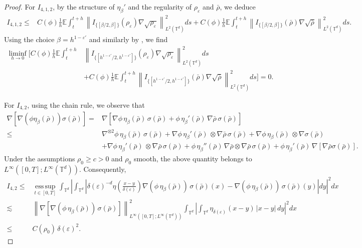 \documentclass[UTF-8,reqno]{amsart}
\numberwithin{equation}{section}
\def\geq{\geqslant}
\def\leq{\leqslant}
\def\geq{\geqslant}
\def\leq{\leqslant}
\begin{document}
\begin{proof}
For $I_{4,1,2}$, by the structure of $\eta_{\beta}'$ and the regularity of $\rho_{\varepsilon}$ and $\bar{\rho}$, we deduce
\begin{align*}
I_{4,1,2} \leq& C(\phi) \frac{1}{h} \mathbb{E} \int_t^{t+h} \left\| I_{\{[\beta/2,\beta]\}}(\rho_{\varepsilon}) \nabla\sqrt{\rho_{\varepsilon}} \right\|_{L^2(\mathbb{T}^d)}^2 ds + C(\phi) \frac{1}{h} \mathbb{E} \int_t^{t+h} \left\| I_{\{[\beta/2,\beta]\}}(\bar{\rho}) \nabla\sqrt{\bar{\rho}} \right\|_{L^2(\mathbb{T}^d)}^2 ds.
\end{align*}
Using the choice $\beta = h^{1-\varepsilon'}$ and similarly by \cite[Lemma 7]{FG23}, we find
\begin{align*}
\liminf_{h \to 0} \Big[ C(\phi) \frac{1}{h} \mathbb{E} \int_t^{t+h} &\left\| I_{\{[h^{1-\varepsilon'}/2, h^{1-\varepsilon'}]\}}(\rho_{\varepsilon}) \nabla\sqrt{\rho_{\varepsilon}} \right\|_{L^2(\mathbb{T}^d)}^2 ds\\
 &+ C(\phi) \frac{1}{h} \mathbb{E} \int_t^{t+h} \left\| I_{\{[h^{1-\varepsilon'}/2, h^{1-\varepsilon'}]\}}(\bar{\rho}) \nabla\sqrt{\bar{\rho}} \right\|_{L^2(\mathbb{T}^d)}^2 ds \Big] = 0.
\end{align*}



For $I_{4,2}$, using the chain rule, we observe that
\begin{align*}
\nabla[\nabla(\phi\eta_{\beta}(\bar{\rho}))\sigma(\bar{\rho})]
=& \nabla[\nabla\phi\,\eta_{\beta}(\bar{\rho})\,\sigma(\bar{\rho}) + \phi\,\eta_{\beta}'(\bar{\rho})\,\nabla\bar{\rho}\,\sigma(\bar{\rho})] \\
\leq& \nabla^{\otimes2}\phi\,\eta_{\beta}(\bar{\rho})\,\sigma(\bar{\rho}) + \nabla\phi\,\eta_{\beta}'(\bar{\rho})\,\otimes\nabla\bar{\rho}\,\sigma(\bar{\rho}) + \nabla\phi\,\eta_{\beta}(\bar{\rho})\,\otimes\nabla\sigma(\bar{\rho}) \\
&+ \nabla\phi\,\eta_{\beta}'(\bar{\rho})\,\otimes\nabla\bar{\rho}\,\sigma(\bar{\rho}) + \phi\,\eta_{\beta}''(\bar{\rho})\,\nabla\bar{\rho}\otimes\nabla\bar{\rho}\,\sigma(\bar{\rho}) + \phi\,\eta_{\beta}'(\bar{\rho})\,\nabla[\nabla\bar{\rho}\sigma(\bar{\rho})].
\end{align*}
Under the assumptions $\rho_0 \geq c > 0$ and $\rho_0$ smooth, the above quantity belongs to $L^{\infty}([0,T];L^{\infty}(\mathbb{T}^d))$. Consequently,
\begin{align*}
I_{4,2} \leq& \operatorname*{ess\,sup}_{t \in [0,T]} \int_{\mathbb{T}^d} \left| \int_{\mathbb{T}^d} \left| \delta(\varepsilon)^{-d} \eta\left(\frac{x-y}{\delta(\varepsilon)}\right) \nabla(\phi\,\eta_{\beta}(\bar{\rho}))\,\sigma(\bar{\rho})(x) - \nabla(\phi\,\eta_{\beta}(\bar{\rho}))\,\sigma(\bar{\rho})(y) \right| dy \right|^2 dx \\
\lesssim& \left\| \nabla[\nabla(\phi\,\eta_{\beta}(\bar{\rho}))\,\sigma(\bar{\rho})] \right\|_{L^{\infty}([0,T];L^{\infty}(\mathbb{T}^d))}^2 \int_{\mathbb{T}^d} \left| \int_{\mathbb{T}^d} \eta_{\delta(\varepsilon)}(x-y)\,|x-y|\,dy \right|^2 dx \\
\leq& C(\rho_0)\,\delta(\varepsilon)^2.
\end{align*}


\end{proof}
\end{document}
